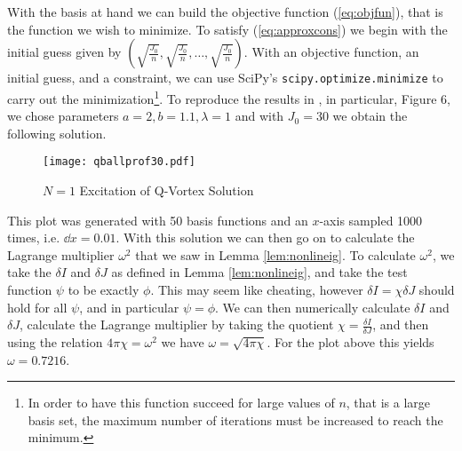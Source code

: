 With the basis at hand we can build the objective function (\ref{eq:objfun}), that is the function we wish to minimize. To satisfy (\ref{eq:approxcons}) we begin with the initial guess given by $\left(\sqrt{\frac{J_0}{n}}, \sqrt{\frac{J_0}{n}}, \ldots, \sqrt{\frac{J_0}{n}}\right)$. With an objective function, an initial guess, and a constraint, we can use SciPy's \texttt{scipy.optimize.minimize} to carry out the minimization\footnote{In order to have this function succeed for large values of $n$, that is a large basis set, the maximum number of iterations must be increased to reach the minimum.}. To reproduce the results in \cite{spinningq}, in particular, Figure 6, we chose parameters $a = 2, b = 1.1, \lambda = 1$ and with $J_0 = 30$ we obtain the following solution.
\begin{figure}[H]
\centering
  \texttt{[image: qballprof30.pdf]}
  \caption{$N = 1$ Excitation of Q-Vortex Solution}
  \label{fig:profile30}
\end{figure}
This plot was generated with 50 basis functions and an $x$-axis sampled 1000 times, i.e. $\dd{x} = 0.01$. With this solution we can then go on to calculate the Lagrange multiplier $\omega^2$ that we saw in Lemma \ref{lem:nonlineig}. To calculate $\omega^2$, we take the $\delta I$ and $\delta J$ as defined in Lemma \ref{lem:nonlineig}, and take the test function $\psi$ to be exactly $\phi$. This may seem like cheating, however $\delta I = \chi\delta J$ should hold for all $\psi$, and in particular $\psi = \phi$. We can then numerically calculate $\delta I$ and $\delta J$, calculate the Lagrange multiplier by taking the quotient $\chi = \frac{\delta I}{\delta J}$, and then using the relation $4\pi\chi = \omega^2$ we have $\omega = \sqrt{4\pi\chi}$. For the plot above this yields $\omega = 0.7216$.

